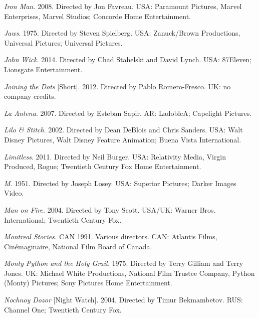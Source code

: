 \medskip\noindent\textit{Iron Man.} 2008. Directed by Jon Favreau. USA: Paramount Pictures, Marvel Enterprises, Marvel Studios; Concorde Home Entertainment.



\medskip\noindent\textit{Jaws}. 1975. Directed by Steven Spielberg. USA: Zanuck/Brown Productions, Universal Pictures; Universal Pictures.



\medskip\noindent\textit{John Wick}. 2014. Directed by Chad Stahelski and David Lynch. USA: 87Eleven; Lionsgate Entertainment.



\medskip\noindent\textit{Joining the Dots} [Short]. 2012. Directed by Pablo Romero-Fresco. UK: no company credits.



\medskip\noindent\textit{La Antena}. 2007. Directed by Esteban Sapir. AR: LadobleA; Capelight Pictures.



\medskip\noindent\textit{Lilo \& Stitch}. 2002. Directed by Dean DeBlois and Chris Sanders. USA: Walt Disney Pictures, Walt Disney Feature Animation; Buena Vista International.



\medskip\noindent\textit{Limitless}. 2011. Directed by Neil Burger. USA: Relativity Media, Virgin Produced, Rogue; Twentieth Century Fox Home Entertainment.



\medskip\noindent\textit{M}. 1951. Directed by Joseph Losey. USA: Superior Pictures; Darker Images Video.



\medskip\noindent\textit{Man on Fire.} 2004. Directed by Tony Scott. USA/UK: Warner Bros. International; Twentieth Century Fox.



\medskip\noindent\textit{Montreal Stories.} CAN 1991. Various directors. CAN: Atlantis Films, Cinémaginaire, National Film Board of Canada.



\medskip\noindent\textit{Monty Python and the Holy Grail.} 1975. Directed by Terry Gilliam and Terry Jones. UK: Michael White Productions, National Film Trustee Company, Python (Monty) Pictures; Sony Pictures Home Entertainment.



\medskip\noindent\textit{Nochnoy Dozor} [Night Watch]. 2004. Directed by Timur Bekmambetov. RUS: Channel One; Twentieth Century Fox.



